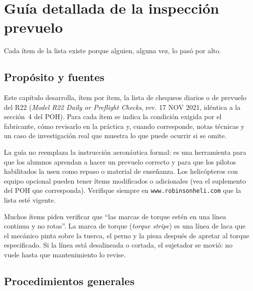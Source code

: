 \chapter{Guía detallada de la inspección prevuelo}
\label{cap:prevuelo-guia}


\opening{Cada ítem de la lista existe porque alguien, alguna vez, lo pasó por alto.}

\section{Propósito y fuentes}

Este capítulo desarrolla, ítem por ítem, la lista de chequeos diarios o de prevuelo del R22 (\emph{Model R22 Daily or Preflight Checks}, rev. 17 NOV 2021, idéntica a la sección~4 del POH). Para cada ítem se indica la condición exigida por el fabricante, cómo revisarlo en la práctica y, cuando corresponde, notas técnicas y un caso de investigación real que muestra lo que puede ocurrir si se omite.

La guía no reemplaza la instrucción aeronáutica formal: es una herramienta para que los alumnos aprendan a hacer un prevuelo correcto y para que los pilotos habilitados la usen como repaso o material de enseñanza. Los helicópteros con equipo opcional pueden tener ítems modificados o adicionales (vea el suplemento del POH que corresponda). Verifique siempre en \texttt{www.robinsonheli.com} que la lista esté vigente.

\begin{insightbox}
Muchos ítems piden verificar que ``las marcas de torque estén en una línea continua y no rotas''. La marca de torque (\emph{torque stripe}) es una línea de laca que el mecánico pinta sobre la tuerca, el perno y la pieza después de apretar al torque especificado. Si la línea está desalineada o cortada, el sujetador se movió: no vuele hasta que mantenimiento lo revise.
\end{insightbox}

\section{Procedimientos generales}

